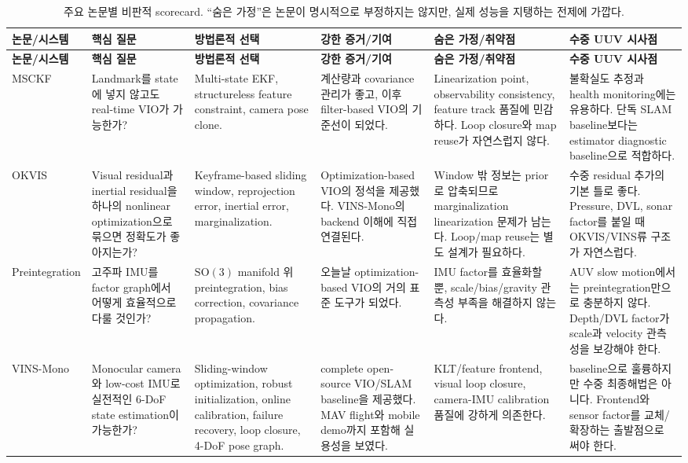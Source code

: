 \documentclass[11pt,a4paper]{article}
\newcommand{\SO}{\mathrm{SO}(3)}
\begin{document}
\begin{landscape}
\small
\begin{longtable}{p{29mm}p{34mm}p{38mm}p{42mm}p{42mm}p{44mm}}
\caption{주요 논문별 비판적 scorecard. ``숨은 가정''은 논문이 명시적으로 부정하지는 않지만, 실제 성능을 지탱하는 전제에 가깝다.}\\
\toprule
\textbf{논문/시스템} & \textbf{핵심 질문} & \textbf{방법론적 선택} & \textbf{강한 증거/기여} & \textbf{숨은 가정/취약점} & \textbf{수중 UUV 시사점} \\
\midrule
\endfirsthead
\toprule
\textbf{논문/시스템} & \textbf{핵심 질문} & \textbf{방법론적 선택} & \textbf{강한 증거/기여} & \textbf{숨은 가정/취약점} & \textbf{수중 UUV 시사점} \\
\midrule
\endhead
\bottomrule
\endfoot

MSCKF \cite{mourikis2007msckf}
& Landmark를 state에 넣지 않고도 real-time VIO가 가능한가?
& Multi-state EKF, structureless feature constraint, camera pose clone.
& 계산량과 covariance 관리가 좋고, 이후 filter-based VIO의 기준선이 되었다.
& Linearization point, observability consistency, feature track 품질에 민감하다. Loop closure와 map reuse가 자연스럽지 않다.
& 불확실도 추정과 health monitoring에는 유용하다. 단독 SLAM baseline보다는 estimator diagnostic baseline으로 적합하다. \\

OKVIS \cite{leutenegger2015okvis}
& Visual residual과 inertial residual을 하나의 nonlinear optimization으로 묶으면 정확도가 좋아지는가?
& Keyframe-based sliding window, reprojection error, inertial error, marginalization.
& Optimization-based VIO의 정석을 제공했다. VINS-Mono의 backend 이해에 직접 연결된다.
& Window 밖 정보는 prior로 압축되므로 marginalization linearization 문제가 남는다. Loop/map reuse는 별도 설계가 필요하다.
& 수중 residual 추가의 기본 틀로 좋다. Pressure, DVL, sonar factor를 붙일 때 OKVIS/VINS류 구조가 자연스럽다. \\

Preintegration \cite{forster2017preintegration}
& 고주파 IMU를 factor graph에서 어떻게 효율적으로 다룰 것인가?
& \(\SO\) manifold 위 preintegration, bias correction, covariance propagation.
& 오늘날 optimization-based VIO의 거의 표준 도구가 되었다.
& IMU factor를 효율화할 뿐, scale/bias/gravity 관측성 부족을 해결하지 않는다.
& AUV slow motion에서는 preintegration만으로 충분하지 않다. Depth/DVL factor가 scale과 velocity 관측성을 보강해야 한다. \\

VINS-Mono \cite{qin2018vinsmono}
& Monocular camera와 low-cost IMU로 실전적인 6-DoF state estimation이 가능한가?
& Sliding-window optimization, robust initialization, online calibration, failure recovery, loop closure, 4-DoF pose graph.
& complete open-source VIO/SLAM baseline을 제공했다. MAV flight와 mobile demo까지 포함해 실용성을 보였다.
& KLT/feature frontend, visual loop closure, camera-IMU calibration 품질에 강하게 의존한다.
& baseline으로 훌륭하지만 수중 최종해법은 아니다. Frontend와 sensor factor를 교체/확장하는 출발점으로 써야 한다. \\


\end{longtable}
\end{landscape}
\end{document}
